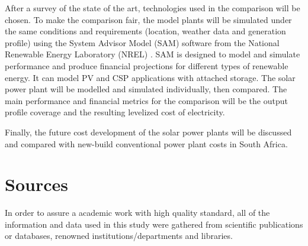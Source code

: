 
After a survey of the state of the art, technologies used in the comparison will be chosen. To make the comparison fair, the model plants will be simulated under the same conditions and requirements (location, weather data and generation profile) using the System Advisor Model (SAM) software from the National Renewable Energy Laboratory (NREL) \cite{NREL2015}. SAM is designed to model and simulate performance and produce financial projections for different types of renewable energy. It can model PV and CSP applications with attached storage. The solar power plant will be modelled and simulated individually, then compared. The main performance and financial metrics for the comparison will be the output profile coverage and the resulting levelized cost of electricity.


Finally, the future cost development of the solar power plants will be discussed and compared with new-build conventional power plant costs in South Africa.

\section{Sources}
In order to assure a academic work with high quality standard, all of the information and data used in this study were gathered from scientific publications or databases, renowned institutions/departments and libraries.

